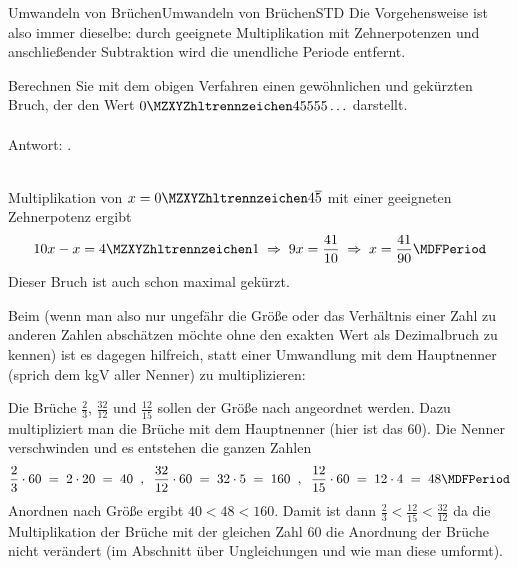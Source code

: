 \begin{MXContent}{Umwandeln von Brüchen}{Umwandeln von Brüchen}{STD}
Die Vorgehensweise ist also immer dieselbe: durch geeignete Multiplikation mit Zehnerpotenzen und anschließender Subtraktion wird die unendliche Periode entfernt.

\begin{MExercise}
Berechnen Sie mit dem obigen Verfahren einen gewöhnlichen und gekürzten Bruch, der den Wert $\MZahl{0}{45555}\ldots$ darstellt.
\ \\ \ \\
Antwort: .
\ \\
\ \\
\begin{MHint}{\iSolution}
Multiplikation von $x=\MZahl{0}{4}\overline{5}$ mit einer geeigneten Zehnerpotenz ergibt
$$
10x-x=\MZahl{4}{1}\;\Rightarrow\; 9x=\Mdfrac{41}{10}\;\Rightarrow\;x=\Mdfrac{41}{90} \MDFPeriod
$$
Dieser Bruch ist auch schon maximal gekürzt.
\end{MHint}
\end{MExercise}

Beim  (wenn man also nur ungefähr die Größe oder das Verhältnis einer Zahl zu anderen Zahlen abschätzen möchte ohne
den exakten Wert als Dezimalbruch zu kennen) ist es dagegen hilfreich, statt einer Umwandlung mit dem Hauptnenner (sprich dem kgV aller Nenner) zu multiplizieren: %

\begin{MExample}
Die Brüche $\frac23$, $\frac{32}{12}$ und $\frac{12}{15}$ sollen der Größe nach angeordnet werden. Dazu multipliziert man die Brüche mit dem Hauptnenner (hier ist das $60$).
Die Nenner verschwinden und es entstehen die ganzen Zahlen
$$
\frac23\cdot 60\;=\; 2\cdot 20\;=\; 40 \;\; ,\;\;
\frac{32}{12}\cdot 60 \;=\; 32\cdot 5\;=\; 160 \;\; , \;\;
\frac{12}{15}\cdot 60 \;=\; 12\cdot 4 \;=\; 48 \MDFPeriod
$$
Anordnen nach Größe ergibt $40<48<160$. Damit ist dann $\frac23<\frac{12}{15}<\frac{32}{12}$ da die Multiplikation der Brüche mit der gleichen Zahl $60$
die Anordnung der Brüche nicht verändert (im Abschnitt  über Ungleichungen und wie man diese umformt).
\end{MExample}


\end{MXContent}
